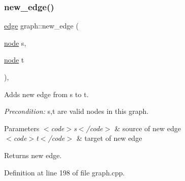 \subsubsection{\texorpdfstring{new\+\_\+edge()}{new\_edge()}\hspace{0.1cm}{\footnotesize\ttfamily [1/2]}}
{\footnotesize\ttfamily \mbox{\hyperlink{classedge}{edge}} graph\+::new\+\_\+edge (\begin{DoxyParamCaption}\item[{\mbox{\hyperlink{classnode}{node}}}]{s,  }\item[{\mbox{\hyperlink{classnode}{node}}}]{t }\end{DoxyParamCaption})\hspace{0.3cm}{\ttfamily [virtual]}, {\ttfamily [inherited]}}

Adds new edge from {\ttfamily s} to {\ttfamily t}.

{\itshape Precondition\+:} {\ttfamily s,t} are valid nodes in this graph.


\begin{DoxyParams}{Parameters}
{\em $<$code$>$s$<$/code$>$} & source of new edge \\
\hline
{\em $<$code$>$t$<$/code$>$} & target of new edge \\
\hline
\end{DoxyParams}
\begin{DoxyReturn}{Returns}
new edge. 
\end{DoxyReturn}


Definition at line 198 of file graph.\+cpp.


